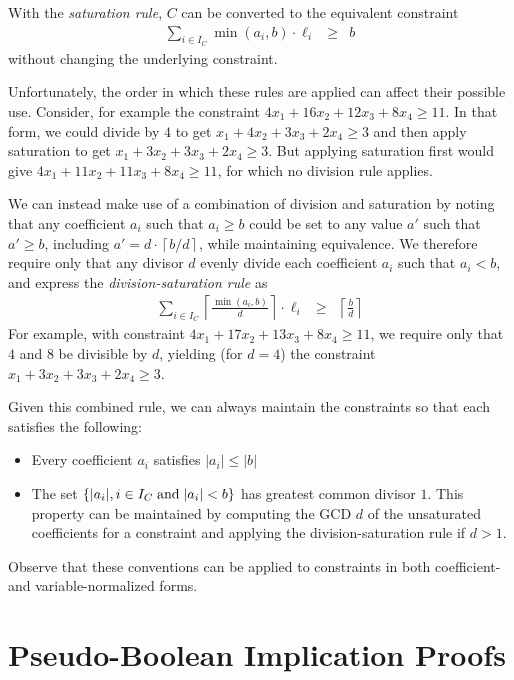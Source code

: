 \documentclass{easychair}
\newcommand{\lit}{\ell}
\newcommand{\indices}{I}
\begin{document}
With the {\em saturation rule}, 
$C$ can be converted to the equivalent constraint
\begin{eqnarray}
\sum_{i \in \indices_C} \min(a_i, b) \cdot \lit_i & \geq & b \label{eqn:saturate}
\end{eqnarray}
without changing the underlying constraint.

Unfortunately, the order in which these rules are applied can affect
their possible use.  Consider, for example the constraint
$4 x_1 + 16 x_2 + 12 x_3 + 8 x_4 \geq 11$.  In that form, we could divide by $4$ to get
$x_1 + 4x_2 + 3 x_3 + 2 x_4 \geq 3$ and then apply saturation to get
$x_1 + 3 x_2 + 3 x_3 + 2 x_4 \geq 3$.
But applying saturation first would give
$4 x_1 + 11 x_2 + 11 x_3 + 8 x_4 \geq 11$,
for which no division rule applies.

We can instead make use of a combination of division and saturation by
noting that any coefficient $a_i$ such that $a_i \geq b$ could be set to any
value $a'$ such that $a' \geq b$, including $a' = d \cdot \left\lceil b / d \right\rceil$,
while maintaining equivalence.  We therefore require only that any divisor $d$ evenly
divide each coefficient $a_i$ such that $a_i < b$, and express the {\em division-saturation rule} as
\begin{eqnarray}
\sum_{i \in \indices_C} \left\lceil \frac{\min(a_i,b)}{d}\right\rceil\cdot \lit_i & \geq & \left\lceil \frac{b}{d} \right\rceil \label{eqn:satdivide}
\end{eqnarray}
For example, with constraint
$4 x_1 + 17 x_2 + 13 x_3 + 8 x_4 \geq 11$, we require only that $4$ and $8$ be divisible by $d$, yielding (for $d=4$) the
constraint
$x_1 + 3 x_2 + 3 x_3 + 2 x_4 \geq 3$.


Given this combined rule, we can always maintain the constraints so that each satisfies the following:
\begin{itemize}
\item Every coefficient $a_i$ satisfies $|a_i| \leq |b|$
\item The set $\{ | a_i |, i \in \indices_C \; {\rm and} \; |a_i| < b \}$ has greatest common
  divisor $1$.  This property can be maintained by computing the GCD $d$ of the
  unsaturated coefficients for a constraint and applying the division-saturation rule if $d > 1$.
\end{itemize}
Observe that these conventions can be applied to constraints in both
coefficient- and variable-normalized forms.

\section{Pseudo-Boolean Implication Proofs}
\end{document}
